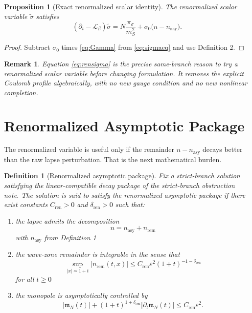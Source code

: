\documentclass[11pt]{article}
\newcommand{\Ell}{\mathcal{L}}
\newtheorem{definition}{Definition}
\newtheorem{proposition}{Proposition}
\newtheorem{remark}{Remark}
\begin{document}
\begin{proposition}[Exact renormalized scalar identity]
The renormalized scalar variable \(\widetilde{\sigma}\) satisfies
\begin{equation}
(\partial_t-\Ell_\beta)\widetilde{\sigma}
=
N\frac{\pi_\sigma}{m_S^2}
+ \sigma_0\bigl(n-n_{\mathrm{asy}}\bigr).
\label{eq:rensigma}
\end{equation}
\end{proposition}

\begin{proof}
Subtract \(\sigma_0\) times \eqref{eq:Gamma} from \eqref{eq:sigmaeq} and use Definition 2.
\end{proof}

\begin{remark}
Equation \eqref{eq:rensigma} is the precise same-branch reason to try a renormalized scalar variable before changing formulation. It removes the explicit Coulomb profile algebraically, with no new gauge condition and no new nonlinear completion.
\end{remark}

\section{Renormalized Asymptotic Package}

The renormalized variable is useful only if the remainder \(n-n_{\mathrm{asy}}\) decays better than the raw lapse perturbation. That is the next mathematical burden.

\begin{definition}[Renormalized asymptotic package]
Fix a strict-branch solution satisfying the linear-compatible decay package of the strict-branch obstruction note. The solution is said to satisfy the \emph{renormalized asymptotic package} if there exist constants \(C_{\mathrm{ren}}>0\) and \(\delta_{\mathrm{ren}}>0\) such that:
\begin{enumerate}
    \item the lapse admits the decomposition
    \begin{equation}
    n=n_{\mathrm{asy}}+n_{\mathrm{rem}}
    \label{eq:ndecomp}
    \end{equation}
    with \(n_{\mathrm{asy}}\) from Definition 1
    \item the wave-zone remainder is integrable in the sense that
    \begin{equation}
    \sup_{|x|\simeq 1+t}|n_{\mathrm{rem}}(t,x)|
    \le
    C_{\mathrm{ren}}\varepsilon^2(1+t)^{-1-\delta_{\mathrm{ren}}}
    \label{eq:nrem}
    \end{equation}
    for all \(t\ge 0\)
    \item the monopole is asymptotically controlled by
    \begin{equation}
    |\mathfrak m_N(t)|
    +(1+t)^{1+\delta_{\mathrm{ren}}}|\partial_t\mathfrak m_N(t)|
    \le
    C_{\mathrm{ren}}\varepsilon^2.
    \label{eq:mcontrol}
    \end{equation}
\end{enumerate}
\end{definition}
\end{document}
